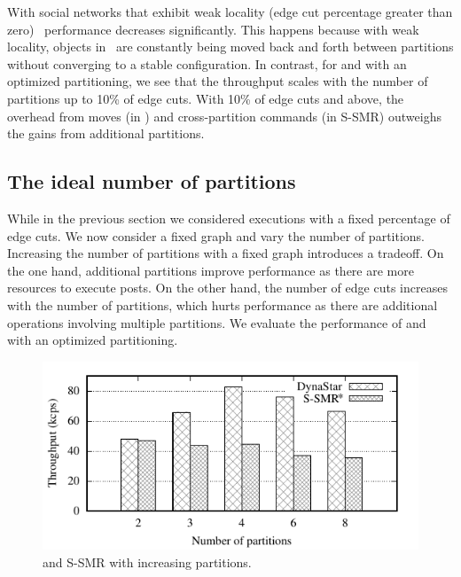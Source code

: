 With social networks that exhibit weak locality (edge cut percentage greater than zero) \dssmr\ performance decreases significantly.  
This happens because with weak locality, objects in \dssmr\ are constantly being moved back and forth between partitions 
without converging to a stable configuration.
In contrast, for \dynastar and \ssmr with an optimized partitioning, we see that the throughput scales with the number of partitions up to 10\% of edge cuts. 
With 10\% of edge cuts and above, the overhead from moves (in \dynastar) and cross-partition commands (in S-SMR) outweighs the gains from additional partitions.



\subsection{The ideal number of partitions}
\label{sec:evaluation:results}

While in the previous section we considered executions with a fixed percentage of edge cuts.
We now consider a fixed graph and vary the number of partitions.
Increasing the number of partitions with a fixed graph introduces a tradeoff.
On the one hand, additional partitions improve performance as there are more resources to execute posts.
On the other hand, the number of edge cuts increases with the number of partitions, which hurts performance as there are additional operations involving multiple partitions.
We evaluate the performance of \dynastar and \ssmr with an optimized partitioning.%

\begin{figure}[ht]
	\includegraphics[width=0.95\columnwidth]{figures/socc/socc-throughput-avg-vary-partition}
	\caption{\dynastar and S-SMR with increasing partitions.}
	\label{fig:4p1p_varying_partition_size}
\end{figure}

